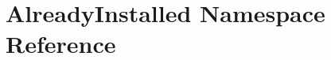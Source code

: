 \hypertarget{namespaceAlreadyInstalled}{\section{Already\-Installed Namespace Reference}
\label{namespaceAlreadyInstalled}
}
